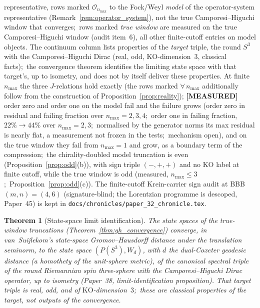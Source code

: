 \documentclass[11pt]{article}
\newtheorem{theorem}{Theorem}
\begin{document}
\begin{table}[h]
{representative, rows marked $\mathcal{O}_{n_{\max}}$ to the Fock/Weyl
\emph{model} of the operator-system representative
(Remark~\ref{rem:operator_system}), not the true Camporesi--Higuchi
window that converges;\ rows marked \emph{true window} are measured
on the true Camporesi--Higuchi window (audit item~6), all other
finite-cutoff entries on model objects.  The continuum column lists properties of the
\emph{target} triple, the round $S^3$ with the Camporesi--Higuchi Dirac
(real, odd, KO-dimension~$3$, classical facts);\ the convergence
theorem identifies the limiting state space with that target's, up to
isometry, and does not by itself deliver these properties.  At finite $n_{\max}$
the three $J$-relations hold exactly (the rows marked
$\forall\, n_{\max}$ additionally follow from the construction of
Proposition~\ref{prop:reality}); \textbf{[MEASURED]} order zero and
order one on the model fail and the failure grows (order zero in
residual and failing fraction over $n_{\max} = 2, 3, 4$;\ order one in
failing fraction, $22\% \to 44\%$ over $n_{\max} = 2, 3$;\ normalised
by the generator norms its max residual is nearly flat, a measurement
not frozen in the tests;\ mechanism open), and on the true window they fail from $n_{\max} = 1$ and grow,
as a boundary term of the compression;\ the chirality-doubled model
truncation is even (Proposition~\ref{prop:odd}(b)), with sign triple
$(-, +, +)$ and no KO label at finite cutoff, while the true window is
odd (measured, $n_{\max} \le 3$;\ Proposition~\ref{prop:odd}(c)).  The
finite-cutoff Krein-carrier sign audit at BBB $(m, n) = (4, 6)$
(signature-blind; the Lorentzian programme is descoped, Paper~45) is
kept in \texttt{docs/chronicles/paper\_32\_chronicle.tex}.}
\label{tab:axiom_audit}
\end{table}

\begin{theorem}[State-space limit identification]
\label{thm:axiom_complete}
The state spaces of the true-window truncations
(Theorem~\ref{thm:gh_convergence}) converge, in van~Suijlekom's
state-space Gromov--Hausdorff distance under the translation seminorm,
to the state space $(P(S^3), W_d)$, with $d$ the dual-Coxeter geodesic
distance (a homothety of the unit-sphere metric), of the canonical
spectral triple of the round Riemannian spin three-sphere with the
Camporesi--Higuchi Dirac operator, up to isometry (Paper~38,
limit-identification proposition).
That target triple is real, odd, and of $\mathrm{KO}$-dimension~$3$;\
these are classical properties of the target, not outputs of the
convergence.
\end{theorem}
\end{document}
